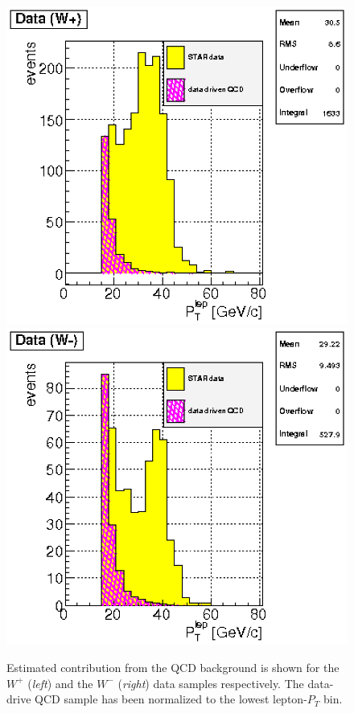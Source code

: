 \documentclass[12pt]{article}
\begin{document}
\begin{figure}[htbp]
\begin{center}
\includegraphics[scale=0.8]{images/backgrounds/plot_4c-1}
\includegraphics[scale=0.8]{images/backgrounds/plot_6c-1}
\end{center}
\caption{Estimated contribution from the QCD background is shown for the $W^{+}$ ({\it left}) and the $W^{-}$ ({\it right}) data samples respectively. The data-drive QCD sample has been normalized to the lowest lepton-$P_{T}$ bin.}
\label{fig:plot_QCD_bkd_pt15} 
\end{figure}
\end{document}
